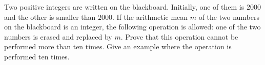 Two positive integers are written on the blackboard. Initially, one of them is $2000$ and the other is smaller than $2000$. If the arithmetic mean $ m$ of the two numbers on the blackboard is an integer, the following operation is allowed: one of the two numbers is erased and replaced by $ m$. Prove that this operation cannot be performed more than ten times. Give an example where the operation is performed ten times.